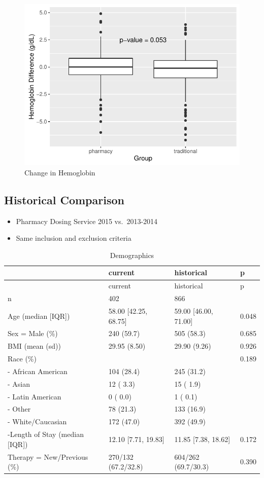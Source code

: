 \documentclass[]{article}
\providecommand{\tightlist}{%
  \setlength{\itemsep}{0pt}\setlength{\parskip}{0pt}}
\begin{document}
\begin{figure}[H]
\centering
\includegraphics{warfarin_analysis_ASHP_files/figure-latex/hgb2-1.pdf}
\caption{Change in Hemoglobin}
\end{figure}

\subsection{Historical Comparison}\label{historical-comparison}

\begin{itemize}
\tightlist
\item
  Pharmacy Dosing Service 2015 vs.~2013-2014
\item
  Same inclusion and exclusion criteria
\end{itemize}

\begin{longtable}[]{@{}llll@{}}
\caption{Demographics}\tabularnewline
\toprule
& current & historical & p\tabularnewline
\midrule
\endfirsthead
\toprule
& current & historical & p\tabularnewline
\midrule
\endhead
n & 402 & 866 &\tabularnewline
Age (median {[}IQR{]}) & 58.00 {[}42.25, 68.75{]} & 59.00 {[}46.00,
71.00{]} & 0.048\tabularnewline
Sex = Male (\%) & 240 (59.7) & 505 (58.3) & 0.685\tabularnewline
BMI (mean (sd)) & 29.95 (8.50) & 29.90 (9.26) & 0.926\tabularnewline
Race (\%) & & & 0.189\tabularnewline
- African American & 104 (28.4) & 245 (31.2) &\tabularnewline
- Asian & 12 ( 3.3) & 15 ( 1.9) &\tabularnewline
- Latin American & 0 ( 0.0) & 1 ( 0.1) &\tabularnewline
- Other & 78 (21.3) & 133 (16.9) &\tabularnewline
- White/Caucasian & 172 (47.0) & 392 (49.9) &\tabularnewline
-Length of Stay (median {[}IQR{]}) & 12.10 {[}7.71, 19.83{]} & 11.85
{[}7.38, 18.62{]} & 0.172\tabularnewline
Therapy = New/Previous (\%) & 270/132 (67.2/32.8) & 604/262 (69.7/30.3)
& 0.390\tabularnewline
\bottomrule
\end{longtable}
\end{document}
